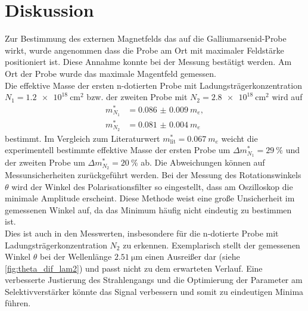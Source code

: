 \section{Diskussion}
\label{sec:Diskussion}
Zur Bestimmung des externen Magnetfelds das auf die Galliumarsenid-Probe wirkt, wurde angenommen dass die Probe am Ort mit maximaler Feldstärke positioniert ist.
Diese Annahme konnte bei der Messung bestätigt werden.
Am Ort der Probe wurde das maximale Magentfeld gemessen.
\\
Die effektive Masse der ersten n-dotierten Probe mit Ladungsträgerkonzentration $N_1 = \qty{1.2e18}{\centi\metre^2}$ bzw. der zweiten Probe mit $N_2 = \qty{2.8e18}{\centi\metre^2}$ wird auf 
\begin{align*}
    m^*_{N_1} &= \qty{0.086(9)}{m_e}, \\
    m^*_{N_2} &= \qty{0.081(4)}{m_e}
\end{align*}
bestimmt.
Im Vergleich zum Literaturwert $m^*_\text{lit} = \qty{0.067}{m_e}$ \cite{eff_m} weicht die experimentell bestimmte effektive Masse der ersten Probe um $\Delta m^*_{N_1} = \qty{29}{\percent}$ und der zweiten Probe um $\Delta m^*_{N_2} = \qty{20}{\percent}$ ab.
Die Abweichungen können auf Messunsicherheiten zurückgeführt werden.
Bei der Messung des Rotationswinkels $\theta$ wird der Winkel des Polarisationsfilter so eingestellt, dass am Oszilloskop die minimale Amplitude erscheint.
Diese Methode weist eine große Unsicherheit im gemessenen Winkel auf, da das Minimum häufig nicht eindeutig zu bestimmen ist.
\\
Dies ist auch in den Messwerten, insbesondere für die n-dotierte Probe mit Ladungsträgerkonzentration $N_2$ zu erkennen.
Exemplarisch stellt der gemessenen Winkel $\theta$ bei der Wellenlänge $\qty{2.51}{\micro\metre}$ einen Ausreißer dar (siehe \autoref{fig:theta_dif_lam2}) und passt nicht zu dem erwarteten Verlauf.
Eine verbesserte Justierung des Strahlengangs und die Optimierung der Parameter am Selektivverstärker könnte das Signal verbessern und somit zu eindeutigen Minima führen.
